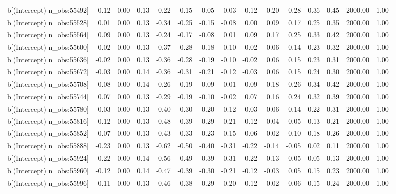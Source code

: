 \begin{table}[ht]
\begin{tabular}{rrrrrrrrrrrrrrr}
  b[(Intercept) n\_obs:55492] & 0.12 & 0.00 & 0.13 & -0.22 & -0.15 & -0.05 & 0.03 & 0.12 & 0.20 & 0.28 & 0.36 & 0.45 & 2000.00 & 1.00 \\ 
  b[(Intercept) n\_obs:55528] & 0.01 & 0.00 & 0.13 & -0.34 & -0.25 & -0.15 & -0.08 & 0.00 & 0.09 & 0.17 & 0.25 & 0.35 & 2000.00 & 1.00 \\ 
  b[(Intercept) n\_obs:55564] & 0.09 & 0.00 & 0.13 & -0.24 & -0.17 & -0.08 & 0.01 & 0.09 & 0.17 & 0.25 & 0.33 & 0.42 & 2000.00 & 1.00 \\ 
  b[(Intercept) n\_obs:55600] & -0.02 & 0.00 & 0.13 & -0.37 & -0.28 & -0.18 & -0.10 & -0.02 & 0.06 & 0.14 & 0.23 & 0.32 & 2000.00 & 1.00 \\ 
  b[(Intercept) n\_obs:55636] & -0.02 & 0.00 & 0.13 & -0.36 & -0.28 & -0.19 & -0.10 & -0.02 & 0.06 & 0.15 & 0.23 & 0.31 & 2000.00 & 1.00 \\ 
  b[(Intercept) n\_obs:55672] & -0.03 & 0.00 & 0.14 & -0.36 & -0.31 & -0.21 & -0.12 & -0.03 & 0.06 & 0.15 & 0.24 & 0.30 & 2000.00 & 1.00 \\ 
  b[(Intercept) n\_obs:55708] & 0.08 & 0.00 & 0.14 & -0.26 & -0.19 & -0.09 & -0.01 & 0.09 & 0.18 & 0.26 & 0.34 & 0.42 & 2000.00 & 1.00 \\ 
  b[(Intercept) n\_obs:55744] & 0.07 & 0.00 & 0.13 & -0.29 & -0.19 & -0.10 & -0.02 & 0.07 & 0.16 & 0.24 & 0.32 & 0.39 & 2000.00 & 1.00 \\ 
  b[(Intercept) n\_obs:55780] & -0.03 & 0.00 & 0.13 & -0.40 & -0.30 & -0.20 & -0.12 & -0.03 & 0.06 & 0.14 & 0.22 & 0.31 & 2000.00 & 1.00 \\ 
  b[(Intercept) n\_obs:55816] & -0.12 & 0.00 & 0.13 & -0.48 & -0.39 & -0.29 & -0.21 & -0.12 & -0.04 & 0.05 & 0.13 & 0.21 & 2000.00 & 1.00 \\ 
  b[(Intercept) n\_obs:55852] & -0.07 & 0.00 & 0.13 & -0.43 & -0.33 & -0.23 & -0.15 & -0.06 & 0.02 & 0.10 & 0.18 & 0.26 & 2000.00 & 1.00 \\ 
  b[(Intercept) n\_obs:55888] & -0.23 & 0.00 & 0.13 & -0.62 & -0.50 & -0.40 & -0.31 & -0.22 & -0.14 & -0.05 & 0.02 & 0.11 & 2000.00 & 1.00 \\ 
  b[(Intercept) n\_obs:55924] & -0.22 & 0.00 & 0.14 & -0.56 & -0.49 & -0.39 & -0.31 & -0.22 & -0.13 & -0.05 & 0.05 & 0.13 & 2000.00 & 1.00 \\ 
  b[(Intercept) n\_obs:55960] & -0.12 & 0.00 & 0.14 & -0.47 & -0.39 & -0.30 & -0.21 & -0.12 & -0.03 & 0.05 & 0.15 & 0.23 & 2000.00 & 1.00 \\ 
  b[(Intercept) n\_obs:55996] & -0.11 & 0.00 & 0.13 & -0.46 & -0.38 & -0.29 & -0.20 & -0.12 & -0.02 & 0.06 & 0.15 & 0.24 & 2000.00 & 1.00 \\ 

\end{tabular}
\end{table}
